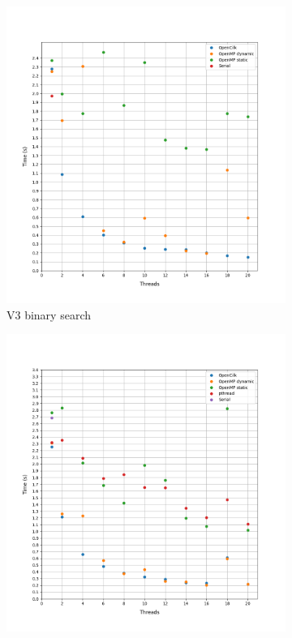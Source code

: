 \documentclass[12pt, a4paper]{article}
\begin{document}
\begin{figure}[h!]
     \begin{subfigure}[b]{0.33\textwidth}
         \centering
         \includegraphics[height=.4\textheight, width=\textwidth, keepaspectratio]{assets/mycielskian/v3.png}
    \caption{V3 binary search}
     \end{subfigure}
     \hfill
     \begin{subfigure}[b]{0.33\textwidth}
         \centering
         \includegraphics[height=.4\textheight, width=\textwidth, keepaspectratio]{assets/mycielskian/v4_binary.png}

\end{subfigure}
\end{figure}
\end{document}
